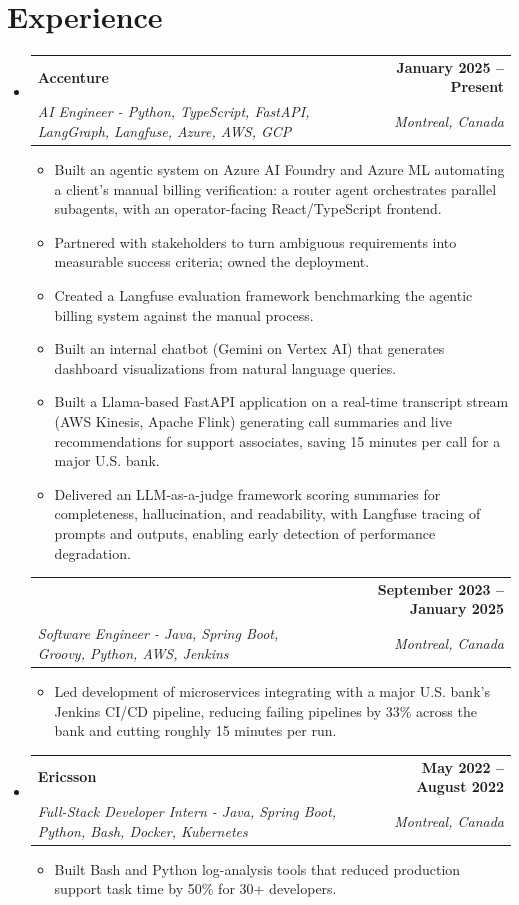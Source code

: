 \documentclass[letterpaper,11pt]{article}
\makeatletter
\newcommand{\resumeItem}[1]{
  \item\small{{#1 \vspace{-2pt}}}
}
\newcommand{\resumeSubheading}[4]{
  \vspace{-2pt}\item
    \begin{tabular*}{1.0\textwidth}[t]{l@{\extracolsep{\fill}}r}
      \textbf{#1} & \textbf{\small #2} \\
      \textit{\small#3} & \textit{\small #4} \\
    \end{tabular*}\vspace{-7pt}
}
\newcommand{\resumeSubheadingContinued}[3]{
  \vspace{4pt}
    \begin{tabular*}{1.0\textwidth}[t]{l@{\extracolsep{\fill}}r}
      & \textbf{\small #2} \\
      \textit{\small#1} & \textit{\small #3} \\
    \end{tabular*}\vspace{-7pt}
}
\newcommand{\resumeSubHeadingListStart}{\begin{itemize}[leftmargin=0.0in, label={}]}
\newcommand{\resumeSubHeadingListEnd}{\end{itemize}}
\newcommand{\resumeItemListStart}{\begin{itemize}}
\newcommand{\resumeItemListEnd}{\end{itemize}\vspace{-5pt}}
\makeatother
\begin{document}
\section{Experience}
  \resumeSubHeadingListStart

    \resumeSubheading
      {Accenture}{January 2025 -- Present}
      {AI Engineer - Python, TypeScript, FastAPI, LangGraph, Langfuse, Azure, AWS, GCP}{Montreal, Canada}
      \resumeItemListStart
        \resumeItem{Built an agentic system on Azure AI Foundry and Azure ML automating a client's manual billing verification: a router agent orchestrates parallel subagents, with an operator-facing React/TypeScript frontend.}
        \resumeItem{Partnered with stakeholders to turn ambiguous requirements into measurable success criteria; owned the deployment.}
        \resumeItem{Created a Langfuse evaluation framework benchmarking the agentic billing system against the manual process.}
        \resumeItem{Built an internal chatbot (Gemini on Vertex AI) that generates dashboard visualizations from natural language queries.}
        \resumeItem{Built a Llama-based FastAPI application on a real-time transcript stream (AWS Kinesis, Apache Flink) generating call summaries and live recommendations for support associates, saving 15 minutes per call for a major U.S. bank.}
        \resumeItem{Delivered an LLM-as-a-judge framework scoring summaries for completeness, hallucination, and readability, with Langfuse tracing of prompts and outputs, enabling early detection of performance degradation.}
      \resumeItemListEnd
      \vspace{-8pt}

    \resumeSubheadingContinued
      {Software Engineer - Java, Spring Boot, Groovy, Python, AWS, Jenkins}{September 2023 -- January 2025}{Montreal, Canada}
      \resumeItemListStart
        \resumeItem{Led development of microservices integrating with a major U.S. bank's Jenkins CI/CD pipeline, reducing failing pipelines by 33\% across the bank and cutting roughly 15 minutes per run.}
      \resumeItemListEnd

    \resumeSubheading
      {Ericsson}{May 2022 -- August 2022}
      {Full-Stack Developer Intern - Java, Spring Boot, Python, Bash, Docker, Kubernetes}{Montreal, Canada}
      \resumeItemListStart
        \resumeItem{Built Bash and Python log-analysis tools that reduced production support task time by 50\% for 30+ developers.}
      \resumeItemListEnd

  \resumeSubHeadingListEnd
\vspace{-14pt}
\end{document}
